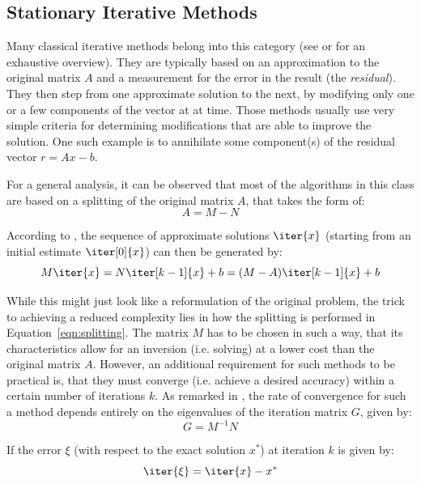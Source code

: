 \subsection{Stationary Iterative Methods}
\label{sec:stationary_methods}

Many classical iterative methods belong into this category (see \cite{saad_iterative_2003} or \cite{golub_matrix_2013} for an exhaustive overview). They are typically based on an approximation to the original matrix $A$ and a measurement for the error in the result (the \textit{residual}). They then step from one approximate solution to the next, by modifying only one or a few components of the vector at at time. Those methods usually use very simple criteria for determining modifications that are able to improve the solution. One such example is to annihilate some component(s) of the residual vector $r=Ax -b$. 

For a general analysis, it can be observed that most of the algorithms in this class are based on a splitting of the original matrix $A$, that takes the form of:
\begin{equation}
\label{eqn:splitting}
    A = M - N
\end{equation}

\noindent According to \cite{golub_matrix_2013}, the sequence of approximate solutions $\iter{x}$ (starting from an initial estimate $\iter[0]{x}$) can then be generated by:
\begin{equation}
    M\iter{x} = N\iter[k-1]{x} +b = (M-A)\iter[k-1]{x}+b
\end{equation}

\noindent While this might just look like a reformulation of the original problem, the trick to achieving a reduced complexity lies in how the splitting is performed in Equation~\hyperref[eqn:splitting]{\ref{eqn:splitting}}. The matrix $M$ has to be chosen in such a way, that its characteristics allow for an inversion (i.e. solving) at a lower cost than the original matrix $A$. However, an additional requirement for such methods to be practical is, that they must converge (i.e. achieve a desired accuracy) within a certain number of iterations $k$. As remarked in \cite{golub_matrix_2013}, the rate of convergence for such a method depends entirely on the eigenvalues of the iteration matrix $G$, given by:
\begin{equation}
    G=M^{-1}N    
\end{equation}

\noindent If the error $\xi$ (with respect to the exact solution $x^*$) at iteration $k$ is given by:
\begin{equation}
    \iter{\xi} = \iter{x} -x^*
\end{equation}

